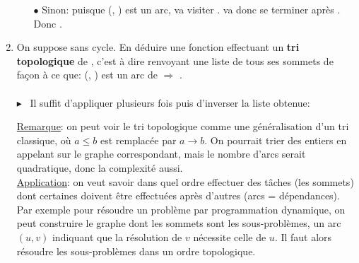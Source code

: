 \documentclass[mp2i]{exam}
\begin{document}
\begin{enumerate}
\begin{enumerate}
			\item[$\bullet$] Sinon: puisque (, ) est un arc,  va visiter .  va donc se terminer après . Donc . 
		\end{enumerate}\fi 
		\item On suppose  sans cycle. En déduire une fonction  effectuant un \textbf{tri topologique} de , c'est à dire renvoyant une liste \ocaml{[v0; v1; ...]} de tous ses sommets de façon à ce que: (, ) est un arc de  $\Longrightarrow$ .\\
		\if{}
		\\$\blacktriangleright$ ~Il suffit d'appliquer plusieurs fois  puis d'inverser la liste obtenue:
		\begin{center}
		\end{center}
		\fi
		\underline{Remarque}: on peut voir le tri topologique comme une généralisation d'un tri classique, où $a \leq b$ est remplacée par $a \rightarrow b$. On pourrait trier des entiers en appelant  sur le graphe correspondant, mais le nombre d'arcs serait quadratique, donc la complexité aussi.\\
		\underline{Application}: on veut savoir dans quel ordre effectuer des tâches (les sommets) dont certaines doivent être effectuées après d'autres (arcs = dépendances). Par exemple pour résoudre un problème par programmation dynamique, on peut construire le graphe dont les sommets sont les sous-problèmes, un arc $(u, v)$ indiquant que la résolution de $v$ nécessite celle de $u$. Il faut alors résoudre les sous-problèmes dans un ordre topologique.
	\end{enumerate}
\end{document}
